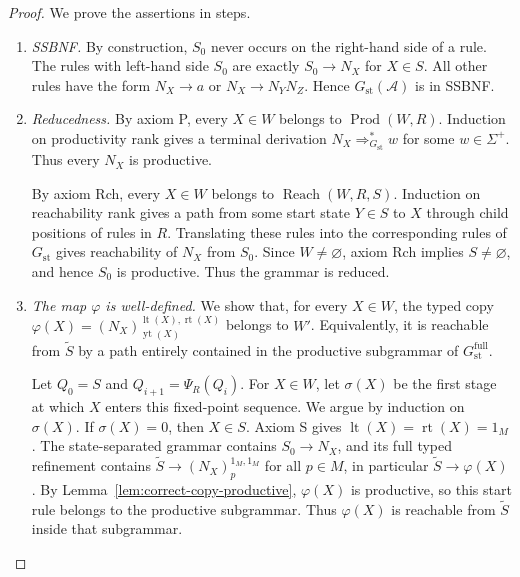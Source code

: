 \documentclass[sub]{jalc}
\newcommand{\yt}{\operatorname{yt}}
\newcommand{\lt}{\operatorname{lt}}
\newcommand{\rt}{\operatorname{rt}}
\newcommand{\eM}{1_M}
\newcommand{\Prod}{\operatorname{Prod}}
\newcommand{\Reach}{\operatorname{Reach}}
\begin{document}
\begin{proof}
We prove the assertions in steps.

\begin{enumerate}[label=\textup{(\arabic*)},leftmargin=2.4em]
\item \emph{SSBNF.} By construction, \(S_0\) never occurs on the right-hand side of a rule. The rules with left-hand side \(S_0\) are exactly \(S_0\to N_X\) for \(X\in S\). All other rules have the form \(N_X\to a\) or \(N_X\to N_YN_Z\). Hence \(G_{\mathrm{st}}(\mathcal A)\) is in SSBNF.

\item \emph{Reducedness.} By axiom P, every \(X\in W\) belongs to \(\Prod(W,R)\). Induction on productivity rank gives a terminal derivation \(N_X\Rightarrow_{G_{\mathrm{st}}}^* w\) for some \(w\in\Sigma^+\). Thus every \(N_X\) is productive.

By axiom Rch, every \(X\in W\) belongs to \(\Reach(W,R,S)\). Induction on reachability rank gives a path from some start state \(Y\in S\) to \(X\) through child positions of rules in \(R\). Translating these rules into the corresponding rules of \(G_{\mathrm{st}}\) gives reachability of \(N_X\) from \(S_0\). Since \(W\neq\varnothing\), axiom Rch implies \(S\neq\varnothing\), and hence \(S_0\) is productive. Thus the grammar is reduced.

\item \emph{The map \(\varphi\) is well-defined.} We show that, for every \(X\in W\), the typed copy \(\varphi(X)=(N_X)_{\yt(X)}^{\lt(X),\rt(X)}\) belongs to \(W'\). Equivalently, it is reachable from \(\widetilde S\) by a path entirely contained in the productive subgrammar of \(G_{\mathrm{st}}^{\mathrm{full}}\).

Let \(Q_0=S\) and \(Q_{i+1}=\Psi_R(Q_i)\). For \(X\in W\), let \(\sigma(X)\) be the first stage at which \(X\) enters this fixed-point sequence. We argue by induction on \(\sigma(X)\). If \(\sigma(X)=0\), then \(X\in S\). Axiom S gives \(\lt(X)=\rt(X)=\eM\). The state-separated grammar contains \(S_0\to N_X\), and its full typed refinement contains \(\widetilde S\to (N_X)_p^{\eM,\eM}\) for all \(p\in M\), in particular \(\widetilde S\to\varphi(X)\). By Lemma~\ref{lem:correct-copy-productive}, \(\varphi(X)\) is productive, so this start rule belongs to the productive subgrammar. Thus \(\varphi(X)\) is reachable from \(\widetilde S\) inside that subgrammar.


\end{enumerate}
\end{proof}
\end{document}
